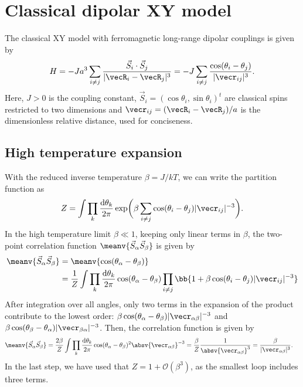 \chapter{Classical dipolar XY model}
\label{xy_model}

The classical XY model with ferromagnetic long-range dipolar couplings is given by
\begin{align}
    H = -J a^3 \sum_{i\ne j} \frac{\vec{S}_i \cdot \vec{S}_j}{|\vecR_i - \vecR_j|^3}
  = -J \sum_{i\ne j} \frac{\cos(\theta_i - \theta_j)}{|\vecr_{ij}|^3}.
\end{align}
Here, $J>0$ is the coupling constant, $\vec{S}_i=(\cos \theta_i, \sin \theta_i)^t$ are classical spins restricted to two dimensions and $\vecr_{ij}=(\vecR_i - \vecR_j)/a$ is the dimensionless relative distance, used for conciseness.

\section{High temperature expansion}
With the reduced inverse temperature $\beta = J/kT$, we can write the partition function as
\begin{align}
    Z=\int\prod_{k} \frac{\mathrm{d}\theta_k}{2\pi}  \operatorname{exp}\!\bigg(\beta \sum_{i\ne j} \cos(\theta_i - \theta_j) |\vecr_{ij}|^{-3} \bigg).
\end{align}
In the high temperature limit $\beta \ll 1$, keeping only linear terms in $\beta$,
the two-point correlation function $\meanv{\vec{S}_\alpha \vec{S}_\beta}$ is given by
\begin{align}
    \meanv{\vec{S}_\alpha \vec{S}_\beta} &= \meanv{\cos(\theta_\alpha - \theta_\beta)} \\ &= \frac{1}{Z} \int\prod_{k} \frac{\mathrm{d}\theta_k}{2\pi}  \cos(\theta_\alpha - \theta_\beta)
    \prod_{i\ne j}  \bb{1 + \beta \cos(\theta_i - \theta_j) |\vecr_{ij}|^{-3}}
\end{align}
After integration over all angles, only two terms in the expansion of the product contribute to the lowest order: $\beta \cos(\theta_\alpha - \theta_\beta) |\vecr_{\alpha\beta}|^{-3}$ and $\beta \cos(\theta_\beta - \theta_\alpha) |\vecr_{\beta\alpha}|^{-3}$. Then, the correlation function is given by
\begin{align}
    \meanv{\vec{S}_\alpha \vec{S}_\beta} &= \frac{2 \beta}{Z} \int\prod_{k} \frac{\mathrm{d}\theta_k}{2\pi} \cos(\theta_\alpha - \theta_\beta)^2 \absv{\vecr_{\alpha\beta}}^{-3}
    = \frac{\beta}{Z} \frac{1}{\absv{\vecr_{\alpha\beta}}^3} = \frac{\beta}{|\vecr_{\alpha\beta}|^3}.
\end{align}
In the last step, we have used that $Z = 1+ \mathcal{O}(\beta^3)$, as the smallest loop includes three terms.

